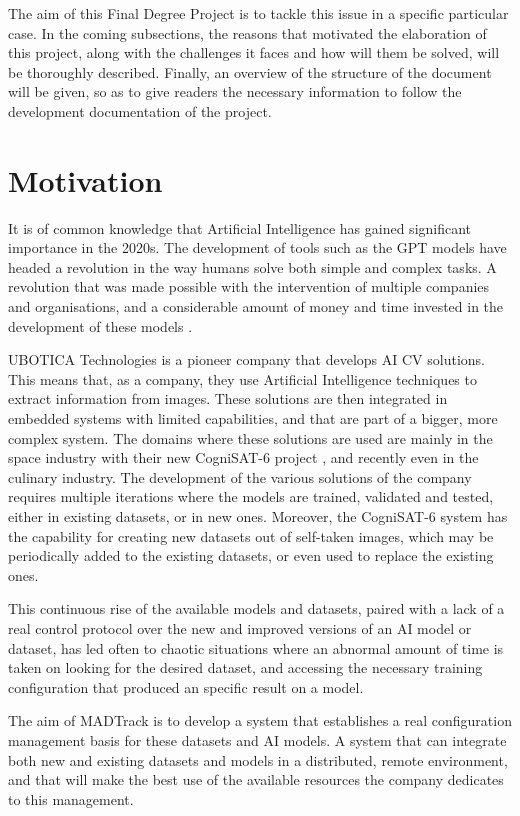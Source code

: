 The aim of this Final Degree Project is to tackle this issue in a specific particular case. In the coming subsections, the reasons that motivated the elaboration
of this project, along with the challenges it faces and how will them be solved, will be thoroughly described. Finally, an overview of the structure of the document
will be given, so as to give readers the necessary information to follow the development documentation of the project.
\section{Motivation}

It is of common knowledge that Artificial Intelligence has gained significant importance in the 2020s. The development of tools such as the GPT models
have headed a revolution in the way humans solve both simple and complex tasks. A revolution that was made possible with the intervention of multiple
companies and organisations, and a considerable amount of money and time invested in the development of these models \cite{AIRise}.

UBOTICA Technologies is a pioneer company that develops \acrshort{AI} \acrfull{CV} solutions. This means that, as a company, they use Artificial Intelligence
techniques to extract information from images. These solutions are then integrated in embedded systems with limited capabilities, and that are part of a 
bigger, more complex system. The domains where these solutions are used are mainly in the space industry with their new CogniSAT-6 project \cite{UBOTICACS6}, 
and recently even in the culinary industry. The development of the various solutions of the company requires multiple iterations where the models are trained,
validated and tested, either in existing datasets, or in new ones. Moreover, the CogniSAT-6 system has the capability for creating new datasets out of self-taken
images, which may be periodically added to the existing datasets, or even used to replace the existing ones.

This continuous rise of the available models and datasets, paired with a lack of a real control protocol over the new and improved versions of an AI model or dataset,
has led often to chaotic situations where an abnormal amount of time is taken on looking for the desired dataset, and accessing the necessary training configuration
that produced an specific result on a model.

The aim of MADTrack is to develop a system that establishes a real configuration management basis for these datasets and AI models. A system that can integrate
both new and existing datasets and models in a distributed, remote environment, and that will make the best use of the available resources the company dedicates
to this management.

